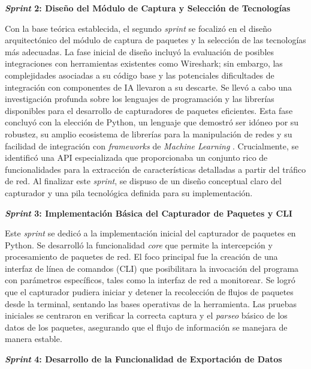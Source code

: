 \textbf{\textit{Sprint} 2: Diseño del Módulo de Captura y Selección de Tecnologías} 

Con la base teórica establecida, el segundo \textit{sprint} se focalizó en el diseño arquitectónico del módulo de captura de paquetes y la selección de las tecnologías más adecuadas. La fase inicial de diseño incluyó la evaluación de posibles integraciones con herramientas existentes como Wireshark; sin embargo, las complejidades asociadas a su código base y las potenciales dificultades de integración con componentes de IA llevaron a su descarte. Se llevó a cabo una investigación profunda sobre los lenguajes de programación y las librerías disponibles para el desarrollo de capturadores de paquetes eficientes. Esta fase concluyó con la elección de Python, un lenguaje que demostró ser idóneo por su robustez, su amplio ecosistema de librerías para la manipulación de redes \cite{Shrefler2017Networking} y su facilidad de integración con \textit{frameworks} de \textit{Machine Learning} \cite{Pedregosa2011ScikitLearn}. Crucialmente, se identificó una API especializada que proporcionaba un conjunto rico de funcionalidades para la extracción de características detalladas a partir del tráfico de red. Al finalizar este \textit{sprint}, se dispuso de un diseño conceptual claro del capturador y una pila tecnológica definida para su implementación.

\textbf{\textit{Sprint} 3: Implementación Básica del Capturador de Paquetes y CLI}

Este \textit{sprint} se dedicó a la implementación inicial del capturador de paquetes en Python. Se desarrolló la funcionalidad \textit{core} que permite la intercepción y procesamiento de paquetes de red. El foco principal fue la creación de una interfaz de línea de comandos (CLI) que posibilitara la invocación del programa con parámetros específicos, tales como la interfaz de red a monitorear. Se logró que el capturador pudiera iniciar y detener la recolección de flujos de paquetes desde la terminal, sentando las bases operativas de la herramienta. Las pruebas iniciales se centraron en verificar la correcta captura y el \textit{parseo} básico de los datos de los paquetes, asegurando que el flujo de información se manejara de manera estable.

\textbf{\textit{Sprint} 4: Desarrollo de la Funcionalidad de Exportación de Datos}

